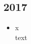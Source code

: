 \subsection*{2017}
\begin{history}


    \begin{itemize}

        \item x\\
              text

    \end{itemize}

\end{history}
